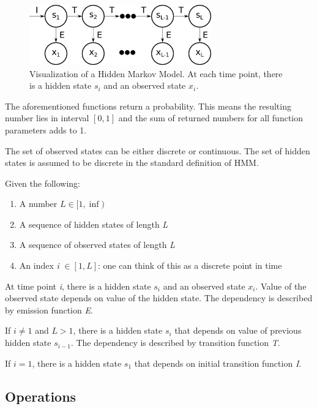 \documentclass[thesis=B,english]{FITthesis}[2012/06/26]
\begin{document}
\begin{figure}
	\centering
 	\includegraphics[width=0.7\textwidth]{hmm}
 	\caption{Visualization of a Hidden Markov Model. At each time point, there is a hidden state $s_i$ and an observed state $x_i$.}
 	\label{fig:hmm}
\end{figure}

The aforementioned functions return a probability. This means the resulting number lies in interval $[0, 1]$ and the sum of returned numbers for all function parameters adds to 1.

The set of observed states can be either discrete or continuous. The set of hidden states is assumed to be discrete in the standard definition of HMM.

Given the following:

\begin{enumerate}

\item A number $L \in [1, \inf)$
\item A sequence of hidden states of length \emph{L}
\item A sequence of observed states of length \emph{L}
\item An index \emph{i} $\in [1, L]$: one can think of this as a discrete point in time

\end{enumerate}

At time point \emph{i}, there is a hidden state $s_i$ and an observed state $x_i$. Value of the observed state depends on value of the hidden state. The dependency is described by emission function \emph{E}.

If $i \neq 1$ and $L > 1$, there is a hidden state $s_i$ that depends on value of previous hidden state $s_{i-1}$. The dependency is described by transition function \emph{T}.

If $i = 1$, there is a hidden state $s_1$ that depends on initial transition function \emph{I}.

\subsection{Operations}
\end{document}
